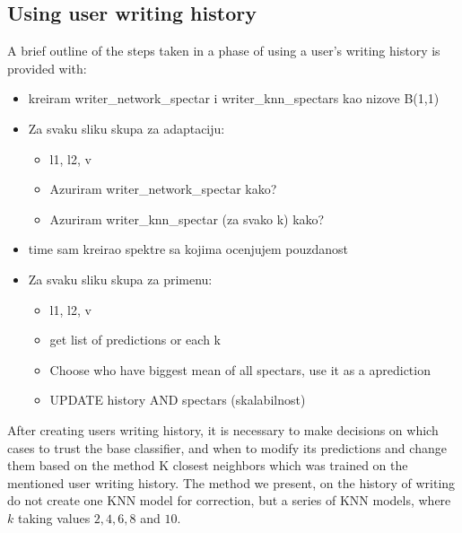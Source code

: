 \documentclass{article}
\begin{document}
\subsection{Using user writing history}

A brief outline of the steps taken in a phase of using a user's writing history is provided with: 
\begin{itemize}
  \item kreiram writer\_network\_spectar i writer\_knn\_spectars kao nizove B(1,1)
  \item Za svaku sliku skupa za adaptaciju:
  \begin{itemize}
    \item l1, l2, v
    \item Azuriram writer\_network\_spectar kako?
    \item Azuriram writer\_knn\_spectar (za svako k) kako?
  \end{itemize}
  \item time sam kreirao spektre sa kojima ocenjujem pouzdanost
  \item Za svaku sliku skupa za primenu:
  \begin{itemize}
    \item l1, l2, v
    \item get list of predictions or each k
    \item Choose who have biggest mean of all spectars, use it as a aprediction
    \item UPDATE history AND spectars (skalabilnost)
  \end{itemize}
\end{itemize}

After creating users writing history, it is necessary to make decisions on which cases to trust the base classifier, and when to modify its predictions and change them based on the method K closest neighbors
which was trained on the mentioned user writing history.
The method we present, on the history of writing do not create one KNN model for correction, but a series of KNN models, where $k$ taking values $2, 4, 6, 8$ and $10$.
\end{document}
